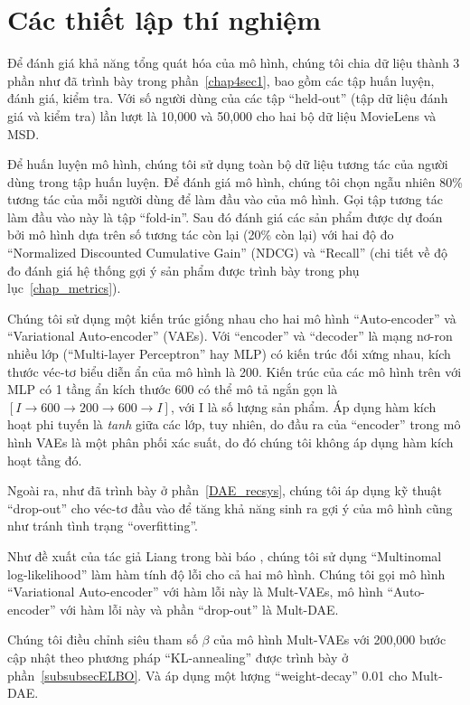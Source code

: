 \section{Các thiết lập thí nghiệm}
\label{setup_experiment}

Để đánh giá khả năng tổng quát hóa của mô hình, chúng tôi chia dữ liệu thành 3 phần như đã trình bày trong phần~\ref{chap4sec1}, bao gồm các tập huấn luyện, đánh giá, kiểm tra. Với số người dùng của các tập ``held-out'' (tập dữ liệu đánh giá và kiểm tra) lần lượt là 10,000 và 50,000 cho hai bộ dữ liệu MovieLens và MSD.

Để huấn luyện mô hình, chúng tôi sử dụng toàn bộ dữ liệu tương tác của người dùng trong tập huấn luyện. Để đánh giá mô hình, chúng tôi chọn ngẫu nhiên 80\% tương tác của mỗi người dùng để làm đầu vào của mô hình. Gọi tập tương tác làm đầu vào này là tập ``fold-in''. Sau đó đánh giá các sản phẩm được dự đoán bởi mô hình dựa trên số tương tác còn lại (20\% còn lại) với hai độ đo ``Normalized Discounted Cumulative Gain'' (NDCG) và ``Recall'' (chi tiết về độ đo đánh giá hệ thống gợi ý sản phẩm được trình bày trong phụ lục~\ref{chap_metrics}).

Chúng tôi sử dụng một kiến trúc giống nhau cho hai mô hình ``Auto-encoder'' và ``Variational Auto-encoder'' (VAEs). Với ``encoder'' và ``decoder'' là mạng nơ-ron nhiều lớp (``Multi-layer Perceptron'' hay MLP) có kiến trúc đối xứng nhau, kích thước véc-tơ biểu diễn ẩn của mô hình là 200. Kiến trúc của các mô hình trên với MLP có 1 tầng ẩn kích thước 600 có thể mô tả ngắn gọn là $[ I \to 600 \to 200 \to 600 \to I ]$, với I là số lượng sản phẩm. Áp dụng hàm kích hoạt phi tuyến là \textit{tanh} giữa các lớp, tuy nhiên, do đầu ra của ``encoder'' trong mô hình VAEs là một phân phối xác suất, do đó chúng tôi không áp dụng hàm kích hoạt tầng đó.

Ngoài ra, như đã trình bày ở phần~\ref{DAE_recsys}, chúng tôi áp dụng kỹ thuật ``drop-out'' cho véc-tơ đầu vào để tăng khả năng sinh ra gợi ý của mô hình cũng như tránh tình trạng ``overfitting''.

Như đề xuất của tác giả Liang trong bài báo \cite{mvae}, chúng tôi sử dụng ``Multinomal log-likelihood'' làm hàm tính độ lỗi cho cả hai mô hình. Chúng tôi gọi mô hình ``Variational Auto-encoder'' với hàm lỗi này là Mult-VAEs, mô hình ``Auto-encoder'' với hàm lỗi này và phần ``drop-out'' là Mult-DAE.

Chúng tôi điều chỉnh siêu tham số $\beta$ của mô hình Mult-VAEs với 200,000 bước cập nhật theo phương pháp ``KL-annealing'' được trình bày ở phần~\ref{subsubsecELBO}. Và áp dụng một lượng ``weight-decay'' 0.01 cho Mult-DAE. 

